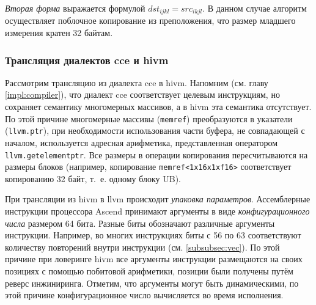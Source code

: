 \textit{Вторая форма} выражается формулой $dst_{ijkl} = src_{ikjl}$. В данном
случае алгоритм осуществляет поблочное копирование из преположения, что размер
младшего измерения кратен 32 байтам.

\subsubsection{Трансляция диалектов cce и hivm}

Рассмотрим трансляцию из диалекта cce в hivm.
Напомним (см. главу \ref{impl:compiler}), что диалект cce соответствует целевым
инструкциям, но сохраняет семантику многомерных массивов, а в hivm эта семантика
отсутствует. По этой причине многомерные массивы (\texttt{memref}) преобразуются
в указатели (\texttt{llvm.ptr}), при необходимости использования части буфера,
не совпадающей с началом, используется адресная арифметика, представленная
оператором \texttt{llvm.getelementptr}. Все размеры в операции копирования
пересчитываются на размеры блоков (например, копирование
\texttt{memref<1x16x1xf16>} соответствует копированию 32 байт, т.~е. одному блоку
UB).

При трансляции из hivm в llvm происходит \textit{упаковка параметров}.
Ассемблерные инструкции процессора Ascend принимают аргументы в виде
\textit{конфигурационного числа} размером 64 бита. Разные биты обозначают
различные аргументы инструкции. Например, во многих инструкциях биты с 56 по 63
соответствуют количеству повторений внутри инструкции (см. \ref{subsubsec:vec}).
По этой причине при ловеринге hivm все аргументы инструкции размещаются на своих
позициях с помощью побитовой арифметики, позиции были получены путём реверс
инжиниринга. Отметим, что аргументы могут быть динамическими, по этой причине
конфигурационное число вычисляется во время исполнения.
